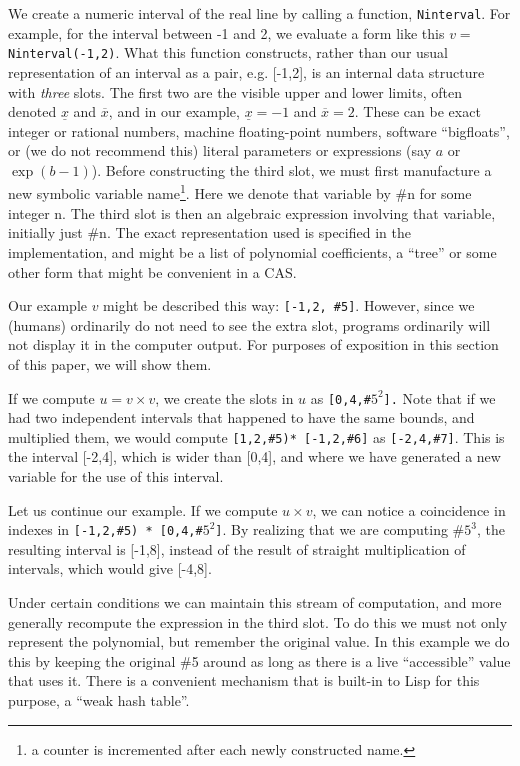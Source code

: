 \documentclass{article}
\begin{document}
We create a numeric interval of the real line by calling a function,
{\tt Ninterval}.  For example, for the interval between -1 and 2, we
evaluate a form like this $v=${\tt Ninterval(-1,2)}.
What this function constructs, rather than
our usual representation of an interval as a pair, e.g. [-1,2], is
an internal data structure with {\em three} slots. The
first two are the visible upper and lower limits, often denoted
${\underline x}$ and ${\overline x}$, and in our example, ${\underline
x}=-1$ and ${\overline x}= 2$.  These can be exact integer or rational
numbers, machine floating-point numbers, software ``bigfloats'', or
(we do not recommend this) literal parameters or expressions (say $a$
or $\exp(b-1)$). Before constructing the third slot, we must first
manufacture a new symbolic variable name\footnote{a counter is
incremented after each newly constructed name.}.  Here we denote that
variable by \#n for some integer n. The third slot is then an
algebraic expression involving that variable, initially just \#n.  The
exact representation used is specified in the implementation, and
might be a list of polynomial coefficients, a ``tree'' or some other
form that might be convenient in a CAS.

Our example $v$ might be described this way: {\tt[-1,2,
\#5]}. However, since we (humans) ordinarily do not need to see the
extra slot, programs ordinarily will not display it in the computer
output. For purposes of exposition in this section of this paper, we
will show them.

If we compute $u= v \times v$, we create the slots in $u$ as
{\tt[0,4,\#$5^2$].}  Note that if we had two independent
intervals that happened to have the same bounds, and multiplied them,
we would compute {\tt[1,2,\#5)* [-1,2,\#6]} as {\tt [-2,4,\#7]}. 
This is the interval [-2,4], which is wider than [0,4], and
where we have generated a new variable for the use of this interval.

Let us continue our example.
If we compute $u \times v$, we can notice a coincidence in indexes in
{\tt [-1,2,\#5) * [0,4,\#$5^2$]}. By realizing that we are
computing \#$5^3$,  the resulting interval is [-1,8], instead of the result of straight
multiplication of intervals,  which would give [-4,8].

Under certain conditions we can maintain this stream of computation,
and more generally recompute the expression in the third slot. To do
this we must not only represent the polynomial, but remember the
original value.  In this example we do this by keeping the original
\#5 around as long as there is a live ``accessible'' value that uses
it. There is a convenient mechanism that is built-in to Lisp for this
purpose, a ``weak hash table''.
\end{document}

